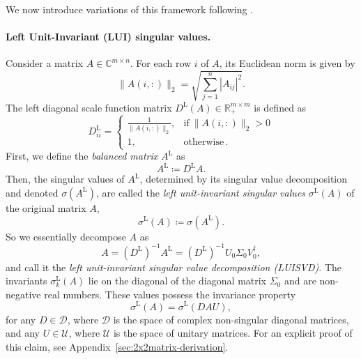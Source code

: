 \documentclass[11pt,a4paper]{article}
\begin{document}
We now introduce variations of this framework following \cite{uhlmann-main2}.
\paragraph{Left Unit-Invariant (LUI) singular values.}
Consider a matrix \( A \in \mathbb{C}^{m \times n} \). For each row $i$ of \( A \), its Euclidean norm is given by
\begin{equation}
\|A(i,:)\|_2 = \sqrt{\sum_{j=1}^{n} |A_{ij}|^2}.
\end{equation}
The left diagonal scale function matrix \( D^\mathrm{L}(A) \in \mathbb{R}^{m\times m}_+\) is defined as
\begin{equation}\label{eq:LDSF}
D^\mathrm{L}_{ii} =
\begin{cases}
\frac{1}{\|A(i, :)\|_2}, & \text{if} \ \|A(i, :)\|_2 > 0 \\
1, & \text{otherwise}\,.
\end{cases}
\end{equation}
First, we define the \textit{balanced matrix} \( A^\mathrm{L} \) as 
\begin{equation}
A^\mathrm{L} \coloneq D^\mathrm{L} A.\label{balancedA}
\end{equation}
Then, the singular values of \( A^\mathrm{L} \), determined by its singular value decomposition and denoted \( \sigma(A^\mathrm{L}) \), are called the \textit{left unit-invariant singular values} \( \sigma^\mathrm{L}(A) \) of the original matrix $A$,
\begin{equation}
\sigma^\mathrm{L}(A) \coloneq \sigma(A^\mathrm{L}).\label{LSVA}
\end{equation}
So we essentially decompose $A$ as
\begin{equation}
A = (D^\mathrm{L})^{-1} A^\mathrm{L} = (D^\mathrm{L})^{-1} U_0 \Sigma_0 V^\dagger_0,
\end{equation}
and call it the \textit{left unit-invariant singular value decomposition (LUISVD)}. The invariants $\sigma_k^\mathrm{L}(A)$ lie on the diagonal of the diagonal matrix $\Sigma_0$ and are non-negative real numbers. These values possess the invariance property
\begin{equation}
\sigma^\mathrm{L}(A) = \sigma^\mathrm{L}(DAU),
\end{equation}
for any \( D \in \mathcal{D} \), where $\mathcal{D}$ is the space of complex non-singular diagonal matrices, and any \( U \in \mathcal{U} \), where $\mathcal{U}$ is the space of unitary matrices. For an explicit proof of this claim, see Appendix~\ref{sec:2x2matrix-derivation}.
\end{document}
